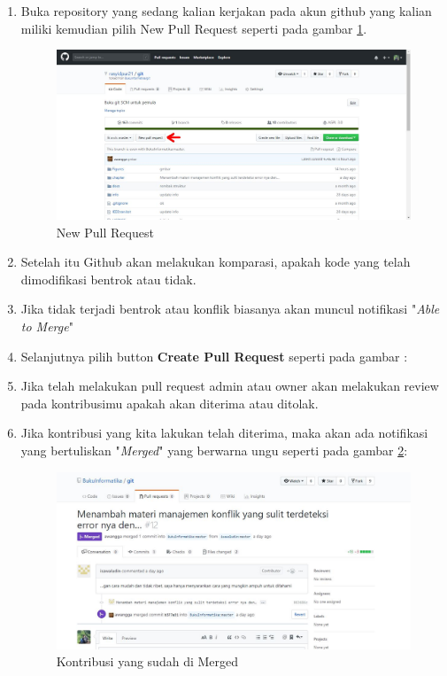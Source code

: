 \begin{enumerate}
\item Buka repository yang sedang kalian kerjakan pada akun github yang kalian miliki kemudian pilih New Pull Request seperti pada gambar \subitem
\ref{fig:newpull}.
\begin{figure}[!htbp]
\centerline{\includegraphics[width=.75\textwidth]{Figures/membacapr/1.JPG}}
\caption{New Pull Request}
\label{fig:newpull}
\end{figure}
\item Setelah itu Github akan melakukan komparasi, apakah kode yang telah dimodifikasi bentrok atau tidak.
\item Jika tidak terjadi bentrok atau konflik biasanya akan muncul notifikasi "\textit{Able to Merge}"
\item Selanjutnya pilih button \textbf{Create Pull Request} seperti pada gambar :
\item Jika telah melakukan pull request admin atau owner akan melakukan review pada kontribusimu apakah akan diterima atau ditolak.
\item Jika kontribusi yang kita lakukan telah diterima, maka akan ada notifikasi yang bertuliskan "\textit{Merged}" yang berwarna ungu seperti pada gambar \ref{fig:merged}:
\subitem
\begin{figure}[!htbp]
\centerline{\includegraphics[width=.75\textwidth]{Figures/membacapr/merged.JPG}}
\caption{Kontribusi yang sudah di Merged}
\label{fig:merged}
\end{figure}
\end{enumerate}

